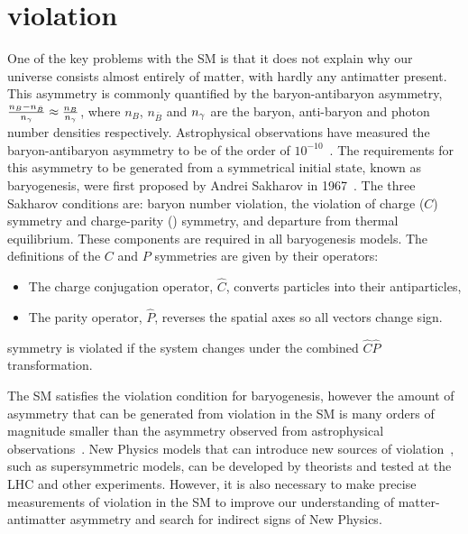\section{\CP violation}

One of the key problems with the SM is that it does not explain why our universe consists almost entirely of matter, with hardly any antimatter present. This asymmetry is commonly quantified by the baryon-antibaryon asymmetry, $\frac{n_{B} - n_{\bar{B}}}{n_{{\gamma}}} \approx \frac{n_{B}}{n_{{\gamma}}}$, where $n_{B}$, $n_{\bar{B}}$ and $n_{{\gamma}}$ are the baryon, anti-baryon and photon number densities respectively. Astrophysical observations have measured the baryon-antibaryon asymmetry to be of the order of $10^{-10}$~\cite{astrophysicalasy}. The requirements for this asymmetry to be generated from a symmetrical initial state, known as baryogenesis, were first proposed by Andrei Sakharov in 1967~\cite{sakharov}. The three Sakharov conditions are: baryon number violation, the violation of charge ($C$) symmetry and charge-parity (\CP) symmetry, and departure from thermal equilibrium. These components are required in all baryogenesis models. The definitions of the $C$ and $P$ symmetries are given by their operators:
\begin{itemize}
\item The charge conjugation operator, $\hat{C}$, converts particles into their antiparticles,
\item The parity operator, $\hat{P}$, reverses the spatial axes so all vectors change sign.
\end{itemize}
\CP symmetry is violated if the system changes under the combined $\hat{C}\hat{P}$ transformation.

The SM satisfies the \CP violation condition for baryogenesis, however the amount of asymmetry that can be generated from \CP violation in the SM is many orders of magnitude smaller than the asymmetry observed from astrophysical observations~\cite{SMasy}. New Physics models that can introduce new sources of \CP violation~\cite{BSMCP}, such as supersymmetric models, can be developed by theorists and tested at the LHC and other experiments. However, it is also necessary to make precise measurements of \CP violation in the SM to improve our understanding of matter-antimatter asymmetry and search for indirect signs of New Physics.

